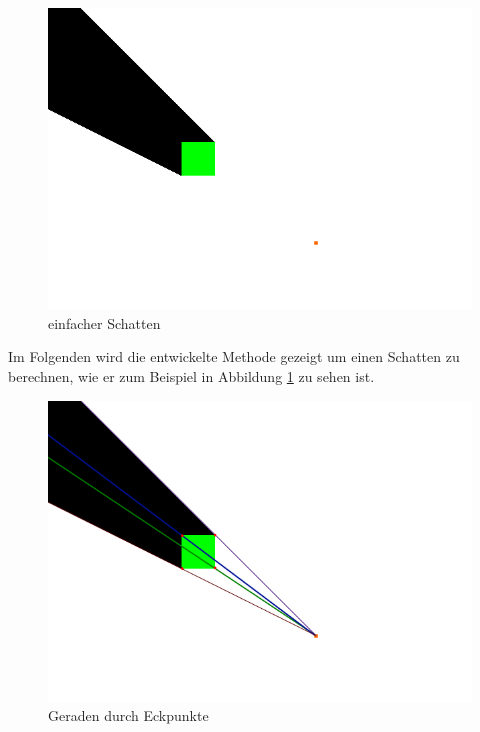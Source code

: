 \documentclass[10pt,twocolumn]{scrartcl}
\begin{document}
\begin{figure}[t]
	\centering
	\includegraphics[width=\columnwidth]{images/durchfuehrung.png}
	\caption{einfacher Schatten}
	\label{fig:durch1}
\end{figure}

Im Folgenden wird die entwickelte Methode gezeigt um einen Schatten zu berechnen, wie er zum Beispiel in Abbildung \ref{fig:durch1} zu sehen ist.

\begin{figure}[t]
	\centering
	\includegraphics[width=\columnwidth]{images/durchfuehrung_1.png}
	\caption{Geraden durch Eckpunkte}
	\label{fig:durch2}
\end{figure}
\end{document}
